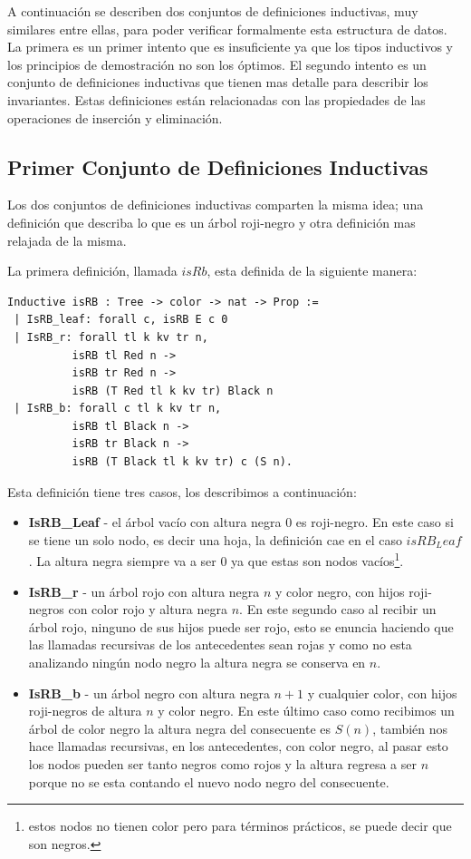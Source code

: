 \documentclass[8pt,leqno,pdflatex,spanish]{book}
\newcommand{\arn}{árbol roji-negro}
\theoremstyle{plain}
\theoremstyle{definition}
\theoremstyle{remark}
\begin{document}
A continuaci\'on se describen dos conjuntos de definiciones inductivas, muy similares entre ellas, 
para poder verificar formalmente esta estructura de datos. La primera es un primer intento que es 
insuficiente ya que los tipos inductivos y los principios de demostraci\'on no son los \'optimos. 
El segundo intento es un conjunto de definiciones inductivas que tienen mas detalle para describir 
los invariantes. Estas definiciones est\'an relacionadas con las propiedades de las operaciones de 
inserci\'on y eliminaci\'on. 

\subsection{Primer Conjunto de Definiciones Inductivas}
Los dos conjuntos de definiciones inductivas comparten la misma idea; una definici\'on que 
describa lo que es un {\arn} y otra definici\'on mas relajada de la misma.

La primera definici\'on, llamada $isRb$, esta definida de la siguiente manera: 
\begin{verbatim}
Inductive isRB : Tree -> color -> nat -> Prop :=
 | IsRB_leaf: forall c, isRB E c 0
 | IsRB_r: forall tl k kv tr n,
          isRB tl Red n ->
          isRB tr Red n ->
          isRB (T Red tl k kv tr) Black n
 | IsRB_b: forall c tl k kv tr n,
          isRB tl Black n ->
          isRB tr Black n ->
          isRB (T Black tl k kv tr) c (S n).
\end{verbatim}
Esta definici\'on tiene tres casos, los describimos a continuaci\'on:
\begin{itemize}
        \item \textbf{IsRB\_Leaf} - el árbol vacío con altura negra 0 es roji-negro. En este caso 
        si se tiene un solo nodo, es decir una hoja, la definici\'on cae en el caso $isRB_Leaf$. 
        La altura negra siempre va a ser 0 ya que estas son nodos vacíos\footnote{estos nodos no 
        tienen color pero para términos prácticos, se puede decir que son negros.}.
        \item \textbf{IsRB\_r} - un árbol rojo con altura negra $n$ y color negro, con hijos 
        roji-negros con color rojo y altura negra $n$. En este segundo caso al recibir un \'arbol 
        rojo, ninguno de sus hijos puede ser rojo, esto se enuncia haciendo que las llamadas 
        recursivas de los antecedentes sean rojas y como no esta analizando ningún nodo negro la 
        altura negra se conserva en $n$.   
        \item \textbf{IsRB\_b} - un árbol negro con altura negra $n+1$ y cualquier color, con hijos
        roji-negros de altura $n$ y color negro. En este \'ultimo caso como recibimos un \'arbol 
        de color negro la altura negra del consecuente es $S(n)$, también nos hace llamadas 
        recursivas, en los antecedentes, con color negro, al pasar esto los nodos pueden ser tanto 
        negros como rojos y la altura regresa a ser $n$ porque no se esta contando el nuevo nodo 
        negro del consecuente.
\end{itemize}
\end{document}
